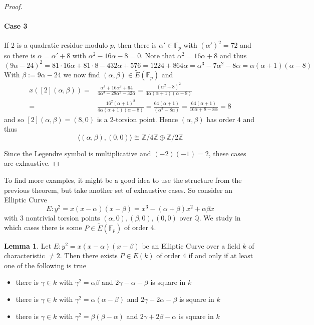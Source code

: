 \documentclass{scrartcl}
\newcommand{\Z}{\mathbb{Z}}
\newcommand{\F}{\mathbb{F}}
\newcommand{\Q}{\mathbb{Q}}
\theoremstyle{definition}
\newtheorem{lemma}[subsection]{Lemma}
\begin{document}
\begin{proof}
    \paragraph{Case 3} If $2$ is a quadratic residue modulo $p$, then there is $\alpha' \in \F_p$ with $(\alpha')^2 = 72$ and so there is $\alpha = \alpha' + 8$ with $\alpha^2 - 16\alpha - 8 = 0$.
    Note that $\alpha^2 = 16\alpha + 8$ and thus
    \begin{equation*}
        (9\alpha - 24)^2 = 81 \cdot 16 \alpha + 81 \cdot 8 - 432 \alpha + 576 = 1224 + 864\alpha = \alpha^3 - 7\alpha^2 - 8\alpha= \alpha (\alpha + 1) (\alpha - 8)
    \end{equation*}
    With $\beta := 9\alpha - 24$ we now find $(\alpha, \beta) \in \tilde{E}(\F_p)$ and
    \begin{align*}
        x([2](\alpha, \beta)) =& \frac {\alpha^4 + 16 \alpha^2 + 64} {4\alpha^3 - 28\alpha^2 - 32\alpha} = \frac {(\alpha^2 + 8)^2} {4\alpha(\alpha + 1)(\alpha - 8)} \\
        =& \frac {16^2(\alpha + 1)^2} {4\alpha(\alpha + 1)(\alpha - 8)} = \frac {64 (\alpha + 1)} {(\alpha^2 - 8\alpha)} = \frac {64 (\alpha + 1)} {16\alpha + 8 - 8\alpha} = 8
    \end{align*}
    and so $[2](\alpha, \beta) = (8, 0)$ is a 2-torsion point.
    Hence $(\alpha, \beta)$ has order $4$ and thus
    \begin{equation*}
        \langle (\alpha, \beta), (0, 0) \rangle \cong \Z/4\Z \oplus \Z/2\Z
    \end{equation*}

    Since the Legendre symbol is multiplicative and $(-2)(-1) = 2$, these cases are exhaustive.
\end{proof}
To find more examples, it might be a good idea to use the structure from the previous theorem, but take another set of exhaustive cases.
So consider an Elliptic Curve
\begin{equation*}
    E: y^2 = x(x - \alpha)(x - \beta) = x^3 - (\alpha + \beta)x^2 + \alpha \beta x
\end{equation*}
with 3 nontrivial torsion points $(\alpha, 0), (\beta, 0), (0, 0)$ over $\Q$.
We study in which cases there is some $P \in \tilde{E}(\F_p)$ of order 4.
\begin{lemma}
    \label{prop:condition_z4_subgroup_mod_p}
    Let $E: y^2 = x(x - \alpha)(x - \beta)$ be an Elliptic Curve over a field $k$ of characteristic $\neq 2$.
    Then there exists $P \in E(k)$ of order 4 if and only if at least one of the following is true
    \begin{itemize}
        \item there is $\gamma \in k$ with $\gamma^2 = \alpha\beta$ and $2\gamma - \alpha - \beta$ is square in $k$
        \item there is $\gamma \in k$ with $\gamma^2 = \alpha(\alpha - \beta)$ and $2\gamma + 2\alpha - \beta$ is square in $k$
        \item there is $\gamma \in k$ with $\gamma^2 = \beta(\beta - \alpha)$ and $2\gamma + 2\beta - \alpha$ is square in $k$
    \end{itemize}
\end{lemma}
\end{document}
